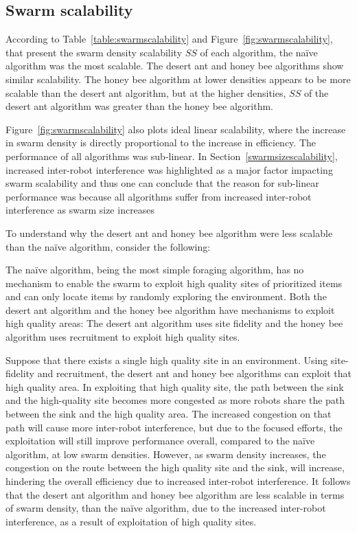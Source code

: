 \subsection{Swarm scalability}
\label{results:swarmscalability}
According to Table~\ref{table:swarmscalability} and Figure~\ref{fig:swarmscalability}, that present the swarm density scalability $SS$ of each algorithm, the na\"ive algorithm was the most scalable. The desert ant and honey bee algorithms show similar scalability. The honey bee algorithm at lower densities appears to be more scalable than the desert ant algorithm, but at the higher densities, $SS$ of the desert ant algorithm was greater than the honey bee algorithm. %

Figure~\ref{fig:swarmscalability} also plots ideal linear scalability, where the increase in swarm density is directly proportional to the increase in efficiency. The performance of all algorithms was sub-linear. In Section~\ref{swarmsizescalability}, increased inter-robot interference was highlighted as a major factor impacting swarm scalability and thus one can conclude that the reason for sub-linear performance was because all algorithms suffer from increased inter-robot interference as swarm size increases

To understand why the desert ant and honey bee algorithm were less scalable than the na\"ive algorithm, consider the following:

The na\"ive algorithm, being the most simple foraging algorithm, has no mechanism to enable the swarm to exploit high quality sites of prioritized items and can only locate items by randomly exploring the environment. Both the desert ant algorithm and the honey bee algorithm have mechanisms to exploit high quality areas: The desert ant algorithm uses site fidelity and the honey bee algorithm uses recruitment to exploit high quality sites. 

Suppose that there exists a single high quality site in an environment. Using site-fidelity and recruitment, the desert ant and honey bee algorithms can exploit that high quality area. In exploiting that high quality site, the path between the sink and the high-quality site becomes more congested as more robots share the path between the sink and the high quality area. The increased congestion on that path will cause more inter-robot interference, but due to the focused efforts, the exploitation will still improve performance overall, compared to the na\"ive algorithm, at low swarm densities. However, as swarm density increases, the congestion on the route between the high quality site and the sink, will increase, hindering the overall efficiency due to increased inter-robot interference. It follows that the desert ant algorithm and honey bee algorithm are less scalable in terms of swarm density, than the na\"ive algorithm, due to the increased inter-robot interference, as a result of exploitation of high quality sites.

